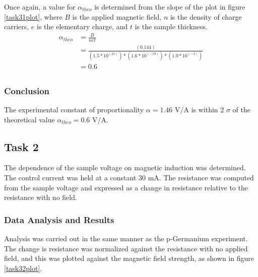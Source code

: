 \documentclass[a4paper]{article}
\begin{document}
\qq Once again, a value for $\alpha_{theo}$ is determined from the
slope of the plot in figure \ref{task31plot}, where $B$ is the applied
magnetic field, $n$ is the density of charge carriers, $e$ is the
elementary charge, and $t$ is the sample thickness.
\begin{align*}
\alpha_{theo} &= \frac{B}{net} \\
              &= \frac{(0.144)}{(1.5 * 10^(21))*(1.6 * 10^(-19))*(1.0 * 10^(-3))} \\
			  &= 0.6 \\
\end{align*}

\subsubsection{Conclusion}
The experimental constant of proportionality $\alpha = 1.46 $ V/A is
within 2 $\sigma$ of the theoretical value $\alpha_{theo} = 0.6 $ V/A.

\subsection{Task 2}

\qq The dependence of the sample voltage on magnetic induction was
determined. The control current was held at a constant 30 mA. The
resistance was computed from the sample voltage and expressed as a
change in resistance relative to the resistance with no field.

\subsubsection{Data Analysis and Results}
\qq Analysis was carried out in the same manner as the p-Germanium
experiment. The change is resistance was normalized against the
resistance with no applied field, and this was plotted against the
magnetic field strength, as shown in figure \ref{task32plot}.
\end{document}
